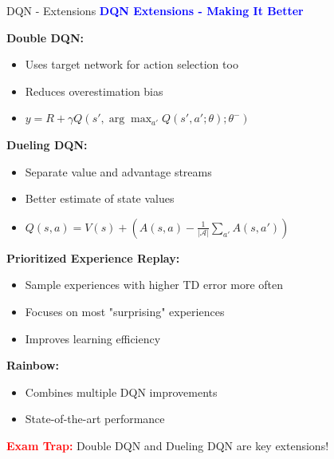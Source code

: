 \documentclass[8pt]{beamer}
\begin{document}
	\begin{frame}{DQN - Extensions}
		\fontsize{6.5}{7.5}\selectfont
		\textcolor{blue}{\textbf{DQN Extensions - Making It Better}}
		
		\textbf{Double DQN:}
		\begin{itemize}
			\item Uses target network for action selection too
			\item Reduces overestimation bias
			\item $y = R + \gamma Q(s', \arg\max_{a'} Q(s',a';\theta); \theta^-)$
		\end{itemize}
		
		\textbf{Dueling DQN:}
		\begin{itemize}
			\item Separate value and advantage streams
			\item Better estimate of state values
			\item $Q(s,a) = V(s) + (A(s,a) - \frac{1}{|\mathcal{A}|}\sum_{a'} A(s,a'))$
		\end{itemize}
		
		\textbf{Prioritized Experience Replay:}
		\begin{itemize}
			\item Sample experiences with higher TD error more often
			\item Focuses on most "surprising" experiences
			\item Improves learning efficiency
		\end{itemize}
		
		\textbf{Rainbow:}
		\begin{itemize}
			\item Combines multiple DQN improvements
			\item State-of-the-art performance
		\end{itemize}
		
		\textcolor{red}{\textbf{Exam Trap:}} Double DQN and Dueling DQN are key extensions!
	\end{frame}
	
\end{document}
